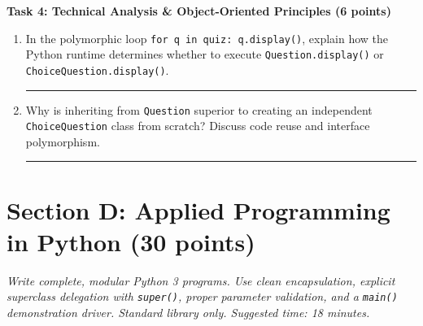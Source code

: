 \documentclass[11pt,a4paper]{article}
\begin{document}
\vspace{0.5mm}
\textbf{Task 4: Technical Analysis \& Object-Oriented Principles (6 points)}
\begin{enumerate}[label=\alph*),leftmargin=1.8em,itemsep=1.5pt]
\item In the polymorphic loop \lstinline|for q in quiz: q.display()|, explain how the Python runtime determines whether to execute \texttt{Question.display()} or \texttt{ChoiceQuestion.display()}.\\[-1pt]\rule{\linewidth}{0.4pt}
\item Why is inheriting from \texttt{Question} superior to creating an independent \texttt{ChoiceQuestion} class from scratch? Discuss code reuse and interface polymorphism.\\[-1pt]\rule{\linewidth}{0.4pt}
\end{enumerate}
\newpage

\section*{Section D: Applied Programming in Python \hfill \normalsize\normalfont(30 points)}
\textit{Write complete, modular Python 3 programs. Use clean encapsulation, explicit superclass delegation with \texttt{super()}, proper parameter validation, and a \texttt{main()} demonstration driver. Standard library only. Suggested time: 18 minutes.}
\end{document}

